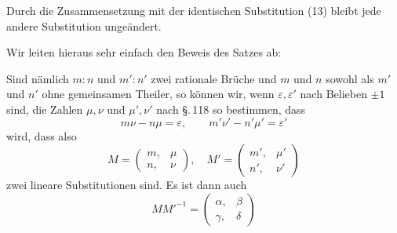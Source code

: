 Durch die Zusammensetzung mit der identischen Substitution (13) bleibt jede andere Substitution ungeändert.

Wir leiten hieraus sehr einfach den Beweis des Satzes ab:


Sind nämlich $m:n$ und $m':n'$ zwei rationale Brüche und $m$ und $n$ sowohl als $m'$ und $n'$ ohne gemeinsamen Theiler, so können wir, wenn $\varepsilon, \varepsilon'$ nach Belieben $\pm 1$ sind, die Zahlen $\mu, \nu$ und $\mu', \nu'$ nach \S.\,118 so bestimmen, dass
\[
m\nu - n\mu = \varepsilon, \qquad m'\nu' - n'\mu' = \varepsilon'
\]
wird, dass also
\[
M = \begin{pmatrix}m, & \mu\\ n, & \nu\end{pmatrix}, \quad M' = \begin{pmatrix}m', & \mu'\\ n', & \nu'\end{pmatrix}
\]
zwei lineare Substitutionen sind. Es ist dann auch
\[
M M'^{-1} = \begin{pmatrix}\alpha, & \beta\\ \gamma, & \delta\end{pmatrix}
\]
